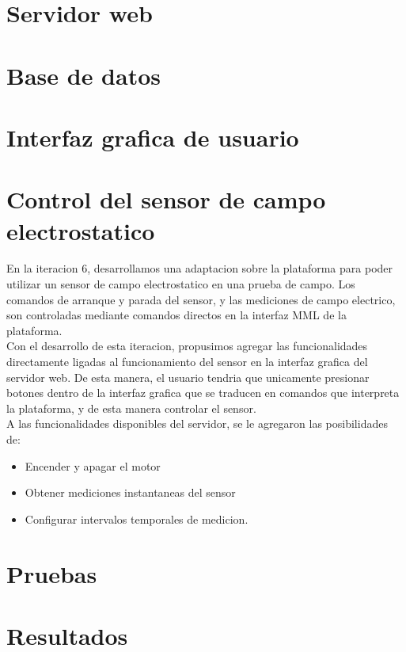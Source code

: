 
\section{Servidor web} %
\label{sec:servidor_web}





\section{Base de datos} %
\label{sec:base_de_datos}


\section{Interfaz grafica de usuario} %
\label{sec:interfaz_grafica_de_usuario}





\section{Control del sensor de campo electrostatico} %
\label{it6:sub:control_desde_raspberry_pi}

En la iteracion 6, desarrollamos una adaptacion sobre la plataforma para poder utilizar un sensor de campo electrostatico en una prueba de campo. Los comandos de arranque y parada del sensor, y las mediciones de campo electrico, son controladas mediante comandos directos en la interfaz MML de la plataforma. \\

Con el desarrollo de esta iteracion, propusimos agregar las funcionalidades directamente ligadas al funcionamiento del sensor en la interfaz grafica del servidor web. De esta manera, el usuario tendria que unicamente presionar botones dentro de la interfaz grafica que se traducen en comandos que interpreta la plataforma, y de esta manera controlar el sensor. \\

A las funcionalidades disponibles del servidor, se le agregaron las posibilidades de:

\begin{itemize}
  \item Encender y apagar el motor
  \item Obtener mediciones instantaneas del sensor
  \item Configurar intervalos temporales de medicion. 
\end{itemize}



\section{Pruebas} %
\label{sec:pruebas}


\section{Resultados} %
\label{sec:resultados}


